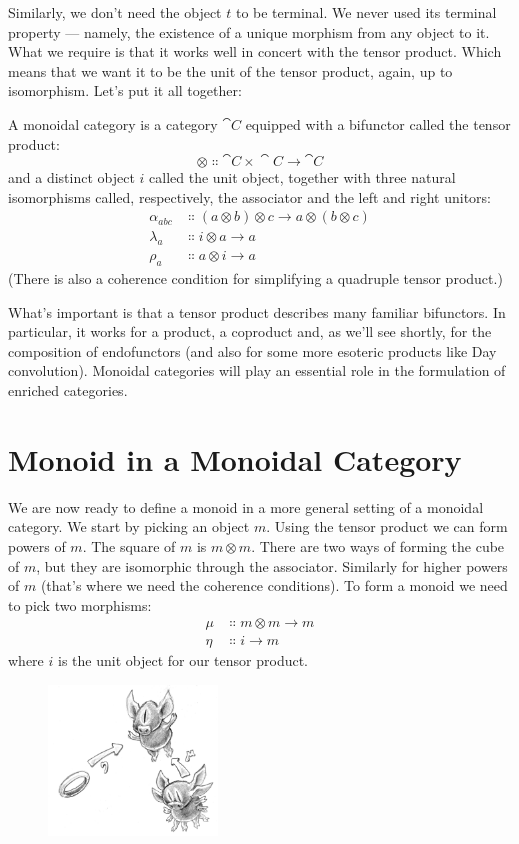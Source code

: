 Similarly, we don't need the object $t$ to be terminal. We never
used its terminal property --- namely, the existence of a unique
morphism from any object to it. What we require is that it works well in
concert with the tensor product. Which means that we want it to be the
unit of the tensor product, again, up to isomorphism. Let's put it all
together:

A monoidal category is a category $\cat{C}$ equipped with a bifunctor
called the tensor product:
\[\otimes \Colon \cat{C}\times{}\cat{C} \to \cat{C}\]
and a distinct object $i$ called the unit object, together with
three natural isomorphisms called, respectively, the associator and the
left and right unitors:
\begin{align*}
  \alpha_{a b c} & \Colon (a \otimes b) \otimes c \to a \otimes (b \otimes c) \\
  \lambda_a      & \Colon i \otimes a \to a                                   \\
  \rho_a         & \Colon a \otimes i \to a
\end{align*}
(There is also a coherence condition for simplifying a quadruple tensor
product.)

What's important is that a tensor product describes many familiar
bifunctors. In particular, it works for a product, a coproduct and, as
we'll see shortly, for the composition of endofunctors (and also for
some more esoteric products like Day convolution). Monoidal categories
will play an essential role in the formulation of enriched categories.

\section{Monoid in a Monoidal Category}

We are now ready to define a monoid in a more general setting of a
monoidal category. We start by picking an object $m$. Using the
tensor product we can form powers of $m$. The square of
$m$ is $m \otimes m$. There are two ways of forming the cube
of $m$, but they are isomorphic through the associator. Similarly
for higher powers of $m$ (that's where we need the coherence
conditions). To form a monoid we need to pick two morphisms:
\begin{align*}
  \mu  & \Colon m \otimes m \to m \\
  \eta & \Colon i \to m
\end{align*}
where $i$ is the unit object for our tensor product.

\begin{figure}[H]
  \centering
  \includegraphics[width=0.4\textwidth]{images/monoid-1.jpg}
\end{figure}

